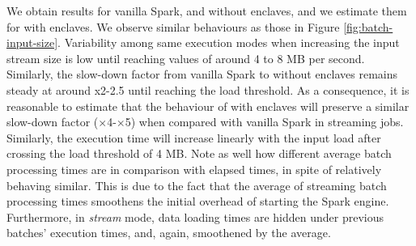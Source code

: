 We obtain results for vanilla Spark, and \sgxspark without enclaves, and we estimate them for \sgxspark with enclaves.
We observe similar behaviours as those in Figure \ref{fig:batch-input-size}. 
Variability among same execution modes when increasing the input stream size is low until reaching values of around 4 to 8 MB per second.
Similarly, the slow-down factor from vanilla Spark to \sgxspark without enclaves remains steady at around x2-2.5 until reaching the load threshold.
As a consequence, it is reasonable to estimate that the behaviour of \sgxspark with enclaves will preserve a similar slow-down factor ($\times$4-$\times$5) when compared with vanilla Spark in streaming jobs.
Similarly, the execution time will increase linearly with the input load after crossing the load threshold of 4 MB.
Note as well how different average batch processing times are in comparison with elapsed times, in spite of relatively behaving similar. 
This is due to the fact that the average of streaming batch processing times smoothens the initial overhead of starting the Spark engine. 
Furthermore, in \emph{stream} mode, data loading times are hidden under previous batches' execution times, and, again, smoothened by the average.
